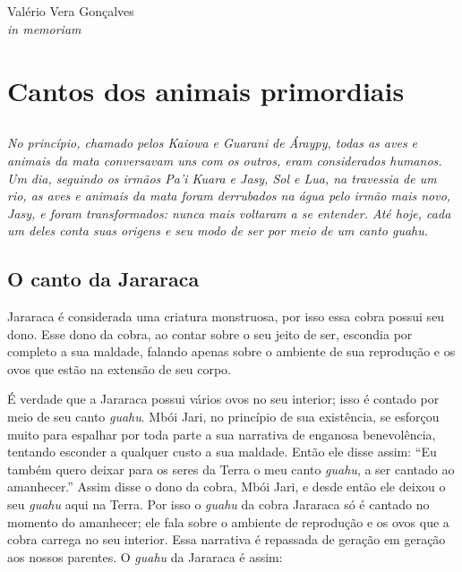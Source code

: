 \chapter*{}
\thispagestyle{empty}

\vfill
\begin{flushright}
\small
Valério Vera Gonçalves\\
\textit{in memoriam} 
\end{flushright}

\part{Cantos dos animais primordiais}%

\chapter*{}
\thispagestyle{empty}
\vspace*{\fill}
\textit{No princípio, chamado pelos Kaiowa e Guarani de \emph{Áraypy}, todas as
aves e animais da mata conversavam uns com os outros, eram considerados
humanos. Um dia, seguindo os irmãos Pa'i Kuara e Jasy, Sol e Lua, na
travessia de um rio, as aves e animais da mata foram derrubados na água
pelo irmão mais novo, Jasy, e foram transformados: nunca mais voltaram a
se entender. Até hoje, cada um deles conta suas origens e seu modo de
ser por meio de um canto \emph{guahu}.}
\vspace*{\fill}

\chapter{O canto da Jararaca}

 Jararaca é considerada uma criatura monstruosa, por isso essa cobra
possui seu dono. Esse dono da cobra, ao contar sobre o seu jeito de ser,
escondia por completo a sua maldade, falando apenas sobre o ambiente de
sua reprodução e os ovos que estão na extensão de seu corpo.

É verdade que a Jararaca possui vários ovos no seu interior; isso é
contado por meio de seu canto \textit{guahu}. Mbói Jari, no princípio de
sua existência, se esforçou muito para espalhar por toda parte a sua
narrativa de enganosa benevolência, tentando esconder a qualquer custo a
sua maldade. Então ele disse assim: ``Eu também quero deixar para os
seres da Terra o meu canto \textit{guahu}, a ser cantado ao amanhecer.''
Assim disse o dono da cobra, Mbói Jari, e desde então ele deixou o seu
\textit{guahu} aqui na Terra. Por isso o \textit{guahu} da cobra Jararaca só
é cantado no momento do amanhecer; ele fala sobre o ambiente de
reprodução e os ovos que a cobra carrega no seu interior. Essa narrativa
é repassada de geração em geração aos nossos parentes. O \textit{guahu} da
Jararaca é assim:


